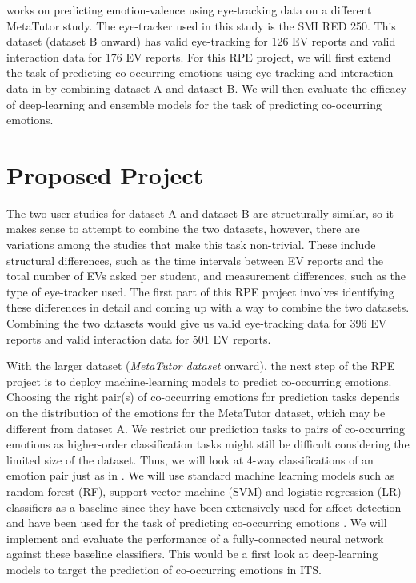 \documentclass[10pt,letterpaper]{article}
\begin{document}
\cite{lalle2018prediction} works on predicting emotion-valence using eye-tracking data on a different MetaTutor study. The eye-tracker used in this study is the SMI RED 250. This dataset (dataset B onward) has valid eye-tracking for 126 EV reports and valid interaction data for 176 EV reports.
For this RPE project, we will first extend the task of predicting co-occurring emotions using eye-tracking and interaction data in \cite{lalle2021predict} by combining dataset A and dataset B. We will then evaluate the efficacy of deep-learning and ensemble models for the task of predicting co-occurring emotions.

\section{Proposed Project}

The two user studies for dataset A and dataset B are structurally similar, so it makes sense to attempt to combine the two datasets, however, there are variations among the studies that make this task non-trivial. These include structural differences, such as the time intervals between EV reports and the total number of EVs asked per student, and measurement differences, such as the type of eye-tracker used. The first part of this RPE project involves identifying these differences in detail and coming up with a way to combine the two datasets. Combining the two datasets would give us valid eye-tracking data for 396 EV reports and valid interaction data for 501 EV reports.


With the larger dataset (\textit{MetaTutor dataset} onward), the next step of the RPE project is to deploy machine-learning models to predict co-occurring emotions. Choosing the right pair(s) of co-occurring emotions for prediction tasks depends on the distribution of the emotions for the MetaTutor dataset, which may be different from dataset A. We restrict our prediction tasks to pairs of co-occurring emotions as higher-order classification tasks might still be difficult considering the limited size of the dataset. Thus, we will look at 4-way classifications of an emotion pair just as in \cite{lalle2021predict}. We will use standard machine learning models such as random forest (RF), support-vector machine (SVM) and logistic regression (LR) classifiers as a baseline since they have been extensively used for affect detection \autocite{zeng2008survey} and have been used for the task of predicting co-occurring emotions \autocite{lalle2021predict}. We will implement and evaluate the performance of a fully-connected neural network against these baseline classifiers. This would be a first look at  deep-learning models to target the prediction of co-occurring emotions in ITS.
\end{document}
